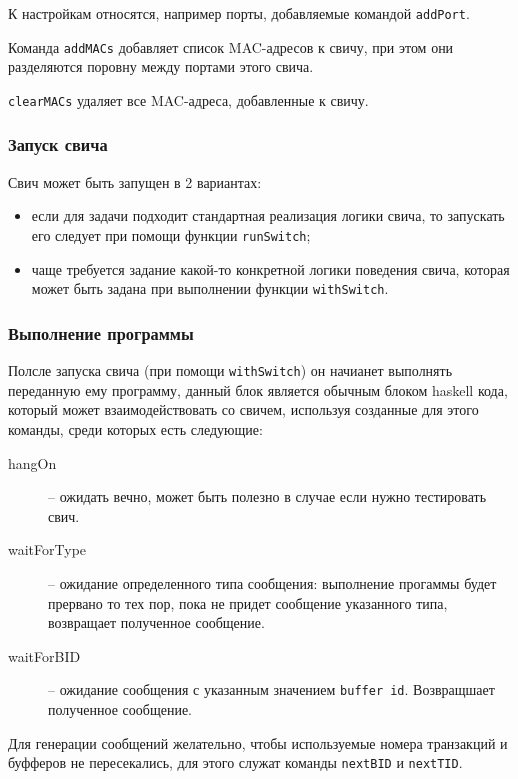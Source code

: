 \documentclass[9pt,a4paper]{article}
\begin{document}
К настройкам относятся, например порты, добавляемые командой \lstinline!addPort!.

Команда \lstinline!addMACs! добавляет список MAC-адресов к свичу, при этом они разделяются
поровну между портами этого свича.

\lstinline!clearMACs! удаляет все MAC-адреса, добавленные к свичу.


\subsubsection{Запуск свича}

Свич может быть запущен в 2 вариантах:

\begin{itemize}
  \item если для задачи подходит стандартная реализация логики свича, то запускать
    его следует при помощи функции \lstinline!runSwitch!;
  \item чаще требуется задание какой-то конкретной логики поведения свича, которая
    может быть задана при выполнении функции \lstinline!withSwitch!.
\end{itemize}


\subsubsection{Выполнение программы}
Полсле запуска свича (при помощи \lstinline!withSwitch!) он начианет выполнять
переданную ему программу, данный блок является обычным блоком haskell кода,
который может взаимодействовать со свичем, используя созданные для этого команды,
среди которых есть следующие:

\begin{description}
  \item[hangOn] -- ожидать вечно, может быть полезно в случае если нужно тестировать
свич.

  \item[waitForType] -- ожидание определенного типа сообщения: выполнение прогаммы
будет прервано то тех пор, пока не придет сообщение указанного типа, возвращает 
полученное сообщение.

  \item[waitForBID] -- ожидание сообщения с указанным значением \lstinline!buffer id!.
Возвращшает полученное сообщение.

\end{description}

Для генерации сообщений желательно, чтобы используемые номера транзакций и буфферов 
не пересекались, для этого служат команды \lstinline!nextBID! и \lstinline!nextTID!.
\end{document}
